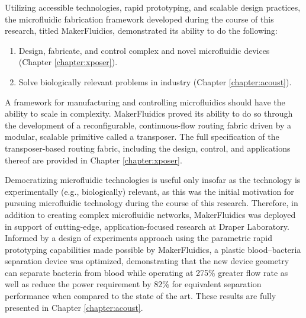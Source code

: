 Utilizing accessible technologies, rapid prototyping, and scalable design practices, the microfluidic fabrication framework developed during the course of this research, titled MakerFluidics, demonstrated its ability to do the following:
\begin{enumerate}
	\item Design, fabricate, and control complex and novel microfluidic devices (Chapter \ref{chapter:xposer}).
	\item Solve biologically relevant problems in industry (Chapter \ref{chapter:acoust}).
\end{enumerate}

A framework for manufacturing and controlling microfluidics should have the ability to scale in complexity. MakerFluidics proved its ability to do so through the development of a reconfigurable, continuous-flow routing fabric driven by a modular, scalable primitive called a transposer. The full specification of the transposer-based routing fabric, including the design, control, and applications thereof are provided in Chapter \ref{chapter:xposer}. 

Democratizing microfluidic technologies is useful only insofar as the technology is experimentally (e.g., biologically) relevant, as this was the initial motivation for pursuing microfluidic technology during the course of this research. Therefore, in addition to creating complex microfluidic networks, MakerFluidics was deployed in support of cutting-edge, application-focused research at Draper Laboratory. Informed by a design of experiments approach using the parametric rapid prototyping capabilities made possible by MakerFluidics, a plastic blood--bacteria separation device was optimized, demonstrating that the new device geometry can separate bacteria from blood while operating at 275\% greater flow rate as well as reduce the power requirement by 82\% for equivalent separation performance when compared to the state of the art. These results are fully presented in Chapter \ref{chapter:acoust}.




